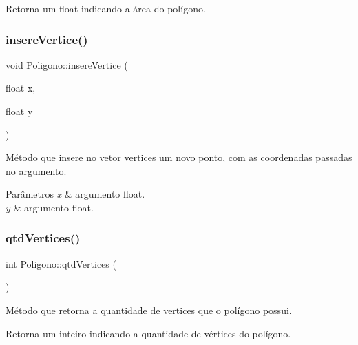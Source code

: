 \begin{DoxyReturn}{Retorna}
um float indicando a área do polígono. 
\end{DoxyReturn}
\mbox{\label{classPoligono_aeaad76667207d96ea0d69c2dfb3bc2a9}} 
\subsubsection{\texorpdfstring{insere\+Vertice()}{insereVertice()}}
{\footnotesize\ttfamily void Poligono\+::insere\+Vertice (\begin{DoxyParamCaption}\item[{float}]{x,  }\item[{float}]{y }\end{DoxyParamCaption})}



Método que insere no vetor \textquotesingle{}vertices\textquotesingle{} um novo ponto, com as coordenadas passadas no argumento. 


\begin{DoxyParams}{Parâmetros}
{\em x} & argumento float. \\
\hline
{\em y} & argumento float. \\
\hline
\end{DoxyParams}
\mbox{\label{classPoligono_ae2c1c915b4a72104724d1302138e7caa}} 
\subsubsection{\texorpdfstring{qtd\+Vertices()}{qtdVertices()}}
{\footnotesize\ttfamily int Poligono\+::qtd\+Vertices (\begin{DoxyParamCaption}{ }\end{DoxyParamCaption})}



Método que retorna a quantidade de vertices que o polígono possui. 

\begin{DoxyReturn}{Retorna}
um inteiro indicando a quantidade de vértices do polígono. 
\end{DoxyReturn}
\mbox{\label{classPoligono_a937c0e2bec60140fcc7b7bde5d64d339}} 
